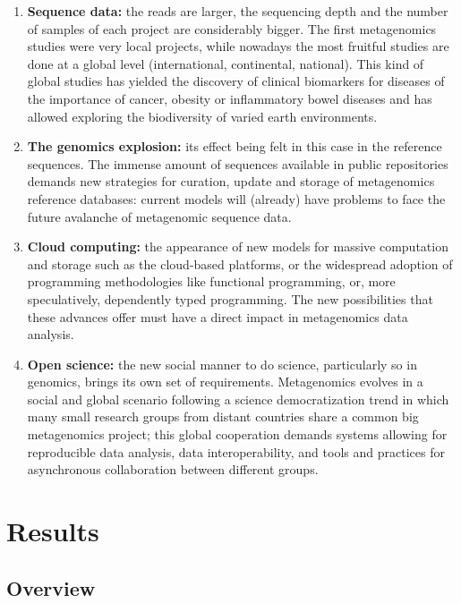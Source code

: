 \documentclass[fleqn,10pt,lineno]{wlpeerj}
\begin{document}
\begin{enumerate}
\def\labelenumi{\arabic{enumi}.}
\item
  \textbf{Sequence data:} the reads are larger, the sequencing depth and
  the number of samples of each project are considerably bigger. The
  first metagenomics studies were very local projects, while nowadays
  the most fruitful studies are done at a global level (international,
  continental, national). This kind of global studies has yielded the
  discovery of clinical biomarkers for diseases of the importance of
  cancer, obesity or inflammatory bowel diseases and has allowed
  exploring the biodiversity of varied earth environments.
\item
  \textbf{The genomics explosion:} its effect being felt in this case in
  the reference sequences. The immense amount of sequences available in
  public repositories demands new strategies for curation, update and
  storage of metagenomics reference databases: current models will
  (already) have problems to face the future avalanche of metagenomic
  sequence data.
\item
  \textbf{Cloud computing:} the appearance of new models for massive
  computation and storage such as the cloud-based platforms, or the
  widespread adoption of programming methodologies like functional
  programming, or, more speculatively, dependently typed programming.
  The new possibilities that these advances offer must have a direct
  impact in metagenomics data analysis.
\item
  \textbf{Open science:} the new social manner to do science,
  particularly so in genomics, brings its own set of requirements.
  Metagenomics evolves in a social and global scenario following a
  science democratization trend in which many small research groups from
  distant countries share a common big metagenomics project; this global
  cooperation demands systems allowing for reproducible data analysis,
  data interoperability, and tools and practices for asynchronous
  collaboration between different groups.
\end{enumerate}

\section{Results}\label{results}

\subsection{Overview}\label{overview}
\end{document}
